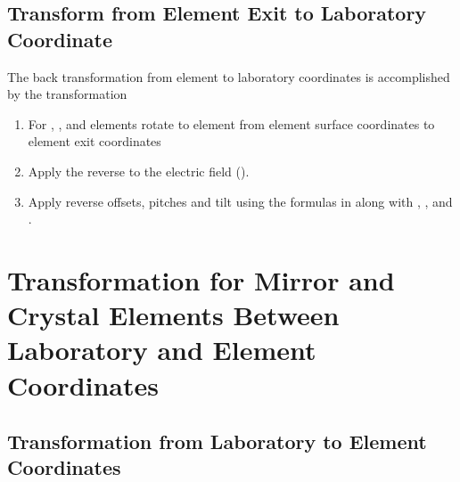\subsection{Transform from Element Exit to Laboratory Coordinate}

The back transformation from element to laboratory coordinates is
accomplished by the transformation
  \begin{enumerate}
  \item
For , , and  elements
rotate to element from element surface coordinates to element exit coordinates
  \item
Apply the reverse  to the electric field ().
  \item
Apply reverse offsets, pitches and tilt using the formulas in
 along with , , and .
  \end{enumerate}

\section[Mirror and Crystal Element Transformation]
{Transformation for Mirror and Crystal Elements Between 
Laboratory and Element Coordinates}
\label{s:photon.lab.ele}


\subsection{Transformation from Laboratory to Element Coordinates}
\label{ss:crystal.trans.le}

